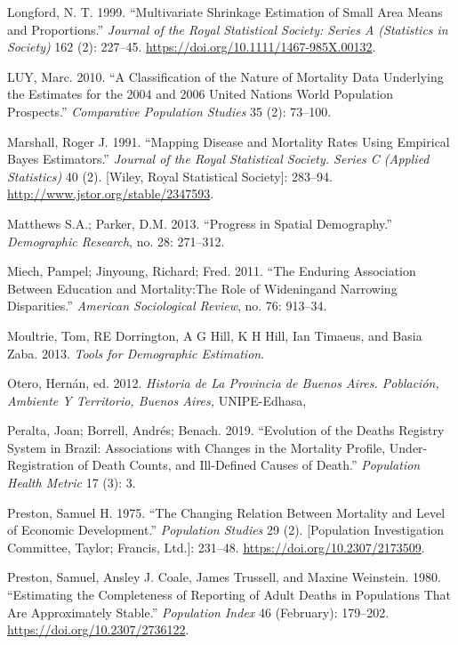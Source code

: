 \documentclass[12pt,]{article}
\begin{document}
\leavevmode\hypertarget{ref-Longford1999}{}%
Longford, N. T. 1999. ``Multivariate Shrinkage Estimation of Small Area
Means and Proportions.'' \emph{Journal of the Royal Statistical Society:
Series A (Statistics in Society)} 162 (2): 227--45.
\url{https://doi.org/10.1111/1467-985X.00132}.

\leavevmode\hypertarget{ref-Luy2010}{}%
LUY, Marc. 2010. ``A Classification of the Nature of Mortality Data
Underlying the Estimates for the 2004 and 2006 United Nations World
Population Prospects.'' \emph{Comparative Population Studies} 35 (2):
73--100.

\leavevmode\hypertarget{ref-Marshall1991}{}%
Marshall, Roger J. 1991. ``Mapping Disease and Mortality Rates Using
Empirical Bayes Estimators.'' \emph{Journal of the Royal Statistical
Society. Series C (Applied Statistics)} 40 (2). {[}Wiley, Royal
Statistical Society{]}: 283--94.
\url{http://www.jstor.org/stable/2347593}.

\leavevmode\hypertarget{ref-Matthews2013}{}%
Matthews S.A.; Parker, D.M. 2013. ``Progress in Spatial Demography.''
\emph{Demographic Research}, no. 28: 271--312.

\leavevmode\hypertarget{ref-Miech2011}{}%
Miech, Pampel; Jinyoung, Richard; Fred. 2011. ``The Enduring Association
Between Education and Mortality:The Role of Wideningand Narrowing
Disparities.'' \emph{American Sociological Review}, no. 76: 913--34.

\leavevmode\hypertarget{ref-Moultrie}{}%
Moultrie, Tom, RE Dorrington, A G Hill, K H Hill, Ian Timaeus, and Basia
Zaba. 2013. \emph{Tools for Demographic Estimation}.

\leavevmode\hypertarget{ref-Otero2012}{}%
Otero, Hernán, ed. 2012. \emph{Historia de La Provincia de Buenos Aires.
Población, Ambiente Y Territorio, Buenos Aires,} UNIPE-Edhasa,

\leavevmode\hypertarget{ref-Peralta2019}{}%
Peralta, Joan; Borrell, Andrés; Benach. 2019. ``Evolution of the Deaths
Registry System in Brazil: Associations with Changes in the Mortality
Profile, Under-Registration of Death Counts, and Ill-Defined Causes of
Death.'' \emph{Population Health Metric} 17 (3): 3.

\leavevmode\hypertarget{ref-Preston1975}{}%
Preston, Samuel H. 1975. ``The Changing Relation Between Mortality and
Level of Economic Development.'' \emph{Population Studies} 29 (2).
{[}Population Investigation Committee, Taylor; Francis, Ltd.{]}:
231--48. \url{https://doi.org/10.2307/2173509}.

\leavevmode\hypertarget{ref-Preston1980}{}%
Preston, Samuel, Ansley J. Coale, James Trussell, and Maxine Weinstein.
1980. ``Estimating the Completeness of Reporting of Adult Deaths in
Populations That Are Approximately Stable.'' \emph{Population Index} 46
(February): 179--202. \url{https://doi.org/10.2307/2736122}.
\end{document}
